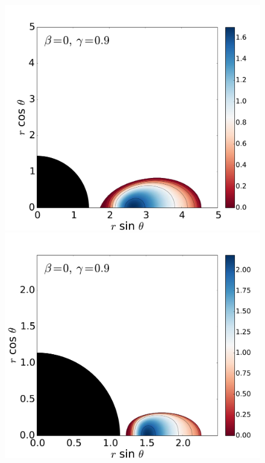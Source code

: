 \documentclass[]{aa}
\begin{document}
\begin{figure}
\includegraphics[scale=0.14]{figures/fig2_4_2.pdf}
\hspace{-0.2cm}
\includegraphics[scale=0.14]{figures/fig2_4_3.pdf}
\\

\end{figure}
\end{document}
